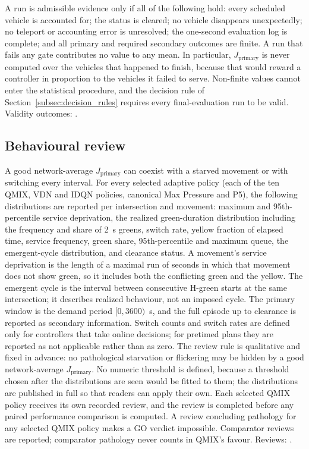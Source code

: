 \documentclass[review,12pt]{elsarticle}
\newcommand{\TBD}[1]{\textcolor{red}{\texttt{\detokenize{#1}}}}
\newcommand{\Jp}{J_{\mathrm{primary}}}
\begin{document}
A run is admissible evidence only if all of the following hold: every
scheduled vehicle is accounted for; the status is cleared; no vehicle
disappears unexpectedly; no teleport or accounting error is unresolved;
the one-second evaluation log is complete; and all primary and required
secondary outcomes are finite. A run that fails any gate contributes no
value to any mean. In particular, $\Jp$ is never computed over the
vehicles that happened to finish, because that would reward a controller
in proportion to the vehicles it failed to serve. Non-finite values
cannot enter the statistical procedure, and the decision rule of
Section~\ref{subsec:decision_rules} requires every final-evaluation run
to be valid. Validity outcomes: \TBD{TBD_AFTER_FINAL_EVALUATION}.

\subsection{Behavioural review}
\label{subsec:behaviour}

A good network-average $\Jp$ can coexist with a starved movement or with
switching every interval. For every selected adaptive policy (each of
the ten QMIX, VDN and IDQN policies, canonical Max Pressure and P5), the
following distributions are reported per intersection and movement:
maximum and 95th-percentile service deprivation, the realized
green-duration distribution including the frequency and share of 2~s
greens, switch rate, yellow fraction of elapsed time, service frequency,
green share, 95th-percentile and maximum queue, the emergent-cycle
distribution, and clearance status. A movement's service deprivation is
the length of a maximal run of seconds in which that movement does not
show green, so it includes both the conflicting green and the yellow.
The emergent cycle is the interval between consecutive H-green starts at
the same intersection; it describes realized behaviour, not an imposed
cycle. The primary window is the demand period $[0,3600)$~s, and the
full episode up to clearance is reported as secondary information.
Switch counts and switch rates are defined only for controllers that
take online decisions; for pretimed plans they are reported as not
applicable rather than as zero. The review rule is
qualitative and fixed in advance: no pathological starvation or
flickering may be hidden by a good network-average $\Jp$. No numeric
threshold is defined, because a threshold chosen after the distributions
are seen would be fitted to them; the distributions are published in
full so that readers can apply their own. Each selected QMIX policy
receives its own recorded review, and the review is completed before any
paired performance comparison is computed. A review concluding
pathology for any selected QMIX policy makes a GO verdict impossible.
Comparator reviews are reported; comparator pathology never counts in
QMIX's favour. Reviews: \TBD{TBD_AFTER_LEARNER_VALIDATION}.
\end{document}
